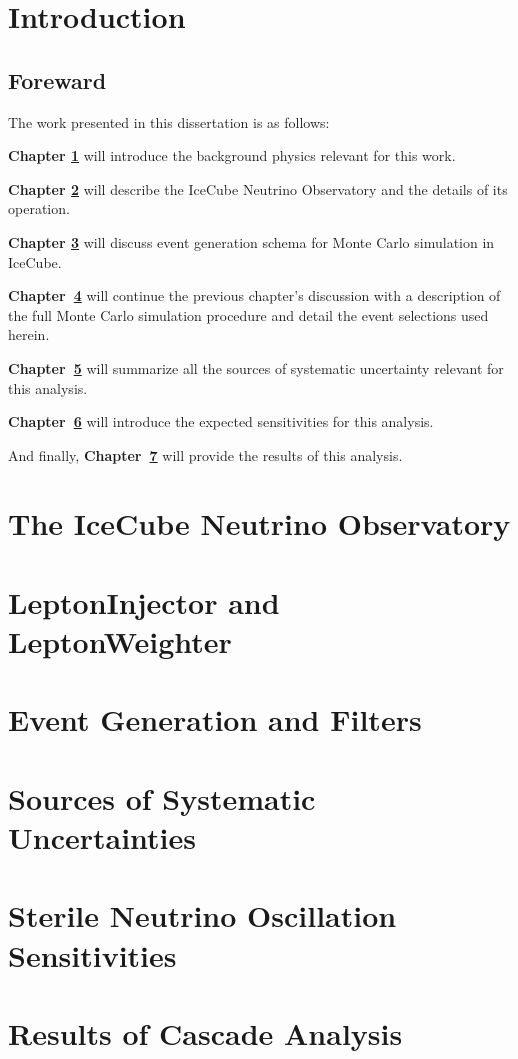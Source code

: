 \documentclass{book}
\numberwithin{figure}{section}
\numberwithin{table}{section}
\numberwithin{equation}{section}
\begin{document}
\tableofcontents

\chapter{Introduction}\label{chapter:intro}
\section{Foreward}

The work presented in this dissertation is as follows:

\textbf{Chapter \ref{chapter:intro}} will introduce the background physics relevant for this work. 

\textbf{Chapter \ref{chapter:icecube}} will describe the IceCube Neutrino Observatory and the details of its operation. 

\textbf{Chapter \ref{chapter:LI}} will discuss event generation schema for Monte Carlo simulation in IceCube.

\textbf{Chapter~\ref{chapter:gen}} will continue the previous chapter's discussion with a description of the full Monte Carlo simulation procedure and detail the event selections used herein.

\textbf{Chapter~\ref{chapter:unc}} will summarize all the sources of systematic uncertainty relevant for this analysis.

\textbf{Chapter~\ref{chapter:sense}} will introduce the expected sensitivities for this analysis. 

And finally,\textbf{ Chapter~\ref{chapter:res}} will provide the results of this analysis. 



\chapter{The IceCube Neutrino Observatory}\label{chapter:icecube}


\chapter{LeptonInjector and LeptonWeighter}\label{chapter:LI}

\chapter{Event Generation and Filters}\label{chapter:gen}

\chapter{Sources of Systematic Uncertainties}\label{chapter:unc}

\chapter{Sterile Neutrino Oscillation Sensitivities}\label{chapter:sense}

\chapter{Results of Cascade Analysis}\label{chapter:res}



% 

% 

\end{document}
